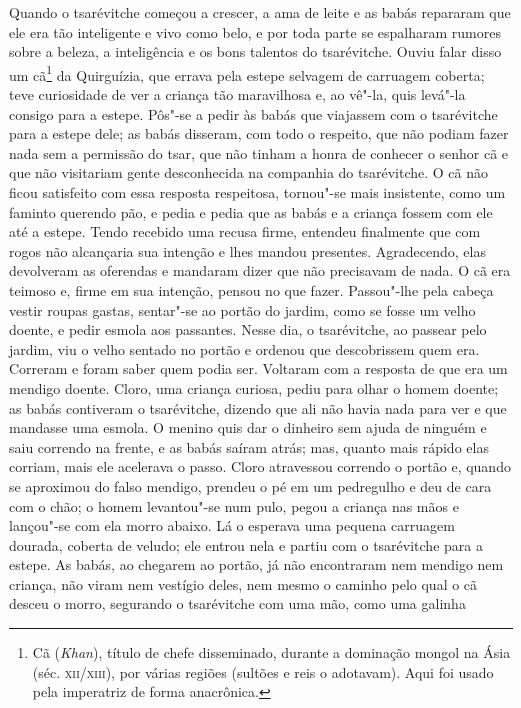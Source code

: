 Quando o tsarévitche começou a crescer, a ama de leite e as babás
repararam que ele era tão inteligente e vivo como belo, e por toda parte
se espalharam rumores sobre a beleza, a inteligência e os bons talentos
do tsarévitche. Ouviu falar disso um cã\footnote{Cã (\emph{Khan}),
  título de chefe disseminado, durante a dominação mongol na Ásia (séc.
  \textsc{xii/xiii}), por várias regiões (sultões e reis o adotavam). Aqui foi
  usado pela imperatriz de forma anacrônica.} da Quirguízia, que errava
pela estepe selvagem de carruagem coberta; teve curiosidade de ver a
criança tão maravilhosa e, ao vê"-la, quis levá"-la consigo para a estepe.
Pôs"-se a pedir às babás que viajassem com o tsarévitche para a estepe
dele; as babás disseram, com todo o respeito, que não podiam fazer nada
sem a permissão do tsar, que não tinham a honra de conhecer o senhor cã
e que não visitariam gente desconhecida na companhia do tsarévitche. O
cã não ficou satisfeito com essa resposta respeitosa, tornou"-se mais
insistente, como um faminto querendo pão, e pedia e pedia que as babás e
a criança fossem com ele até a estepe. Tendo recebido uma recusa firme,
entendeu finalmente que com rogos não alcançaria sua intenção e lhes
mandou presentes. Agradecendo, elas devolveram as oferendas e mandaram
dizer que não precisavam de nada. O cã era teimoso e, firme em sua
intenção, pensou no que fazer. Passou"-lhe pela cabeça vestir roupas
gastas, sentar"-se ao portão do jardim, como se fosse um velho doente, e
pedir esmola aos passantes. Nesse dia, o tsarévitche, ao passear pelo
jardim, viu o velho sentado no portão e ordenou que descobrissem quem
era. Correram e foram saber quem podia ser. Voltaram com a resposta de
que era um mendigo doente. Cloro, uma criança curiosa, pediu para olhar
o homem doente; as babás contiveram o tsarévitche, dizendo que ali não
havia nada para ver e que mandasse uma esmola. O menino quis dar o
dinheiro sem ajuda de ninguém e saiu correndo na frente, e as babás
saíram atrás; mas, quanto mais rápido elas corriam, mais ele acelerava o
passo. Cloro atravessou correndo o portão e, quando se aproximou do
falso mendigo, prendeu o pé em um pedregulho e deu de cara com o chão; o
homem levantou"-se num pulo, pegou a criança nas mãos e lançou"-se com ela
morro abaixo. Lá o esperava uma pequena carruagem dourada, coberta de
veludo; ele entrou nela e partiu com o tsarévitche para a estepe. As
babás, ao chegarem ao portão, já não encontraram nem mendigo nem
criança, não viram nem vestígio deles, nem mesmo o caminho pelo qual o
cã desceu o morro, segurando o tsarévitche com uma mão, como uma galinha
